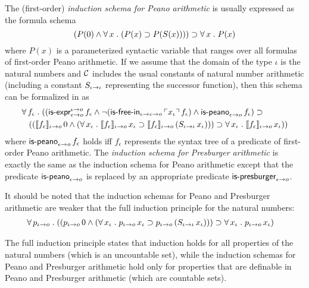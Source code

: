 \documentclass[fleqn]{llncs}
\begin{document}
The (first-order) \emph{induction schema for Peano arithmetic} is
usually expressed as the formula schema
\[(P(0) \wedge \forall\, x \mathrel. (P(x) \supset P(S(x)))) \supset 
\forall\, x \mathrel. P(x)\] where $P(x)$ is a parameterized syntactic
variable that ranges over all formulas of first-order Peano
arithmetic.  If we assume that the domain of the type $\iota$ is the
natural numbers and $\mbox{$\cal C$}$ includes the usual constants of natural
number arithmetic (including a constant $S_{\iota \rightarrow
  \iota}$ representing the successor function), then this schema can
be formalized in {\churchqe} as
\begin{align*}
&
\forall\, f_\epsilon \mathrel. 
((\mbox{\sf is-expr}_{\epsilon \rightarrow o}^{\iota \rightarrow o} \, f_\epsilon \wedge
\neg (\mbox{\sf is-free-in}_{\epsilon \rightarrow \epsilon \rightarrow o} \, 
\ulcorner x_\iota\urcorner \, f_\epsilon) \wedge
\mbox{\sf is-peano}_{\epsilon \rightarrow o} \, f_\epsilon) \supset {} \\
&
\hspace*{2ex}
((\llbracket f_\epsilon\rrbracket_{\iota \rightarrow o} \, 0 \wedge
(\forall\, x_\iota \mathrel. \llbracket f_\epsilon\rrbracket_{\iota \rightarrow o} \, x_\iota \supset
\llbracket f_\epsilon\rrbracket_{\iota \rightarrow o} \, 
(S_{\iota \rightarrow \iota} \, x_\iota)))
\supset 
\forall\, x_\iota \mathrel. \llbracket f_\epsilon\rrbracket_{\iota \rightarrow o} \, x_\iota))
\end{align*}
where $\mbox{\sf is-peano}_{\epsilon \rightarrow o} \, f_\epsilon$ holds iff
$f_\epsilon$ represents the syntax tree of a predicate of
first-order Peano arithmetic.  The \emph{induction schema for
  Presburger arithmetic} is exactly the same as the induction schema
for Peano arithmetic except that the predicate
$\mbox{\sf is-peano}_{\epsilon \rightarrow o}$ is replaced by an appropriate
predicate $\mbox{\sf is-presburger}_{\epsilon \rightarrow o}$.

It should be noted that the induction schemas for Peano and Presburger
arithmetic are weaker that the full induction principle for the
natural numbers:
\begin{align*}
&
\forall\, p_{\iota \rightarrow o} \mathrel. 
((p_{\iota \rightarrow o} \, 0 \wedge
(\forall\, x_\iota \mathrel. p_{\iota \rightarrow o} \, x_\iota \supset
p_{\iota \rightarrow o} \, (S_{\iota \rightarrow \iota} \, x_\iota)))
\supset 
\forall\, x_\iota \mathrel. p_{\iota \rightarrow o} \, x_\iota)
\end{align*}

\noindent
The full induction principle states that induction holds for all
properties of the natural numbers (which is an uncountable set), while
the induction schemas for Peano and Presburger arithmetic hold only
for properties that are definable in Peano and Presburger arithmetic
(which are countable sets).
\end{document}
